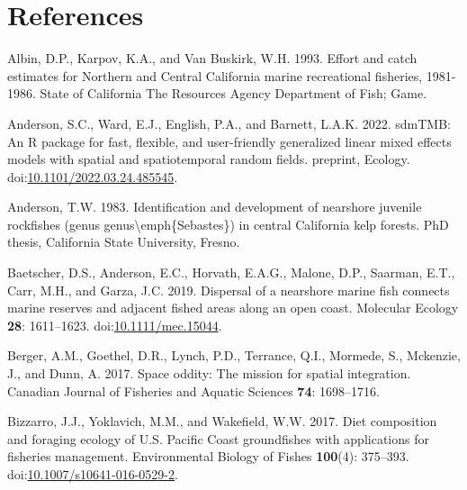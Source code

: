 \documentclass[11pt,
  english,
  letterpaper,
]{article}
\newlength{\cslhangindent}
\newenvironment{CSLReferences}[2] %
 {%
  \setlength{\parindent}{0pt}
  \ifodd #1 \everypar{\setlength{\hangindent}{\cslhangindent}}\ignorespaces\fi
  \ifnum #2 > 0
  \setlength{\parskip}{#2\baselineskip}
  \fi
 }%
 {}
\begin{document}
\hypertarget{references}{%
\section{References}\label{references}}

\hypertarget{refs}{}
\begin{CSLReferences}{1}{0}
\leavevmode{}%
Albin, D.P., Karpov, K.A., and Van Buskirk, W.H. 1993. Effort and catch estimates for {Northern} and {Central} {California} marine recreational fisheries, 1981-1986. State of California The Resources Agency Department of Fish; Game.

\leavevmode{}%
Anderson, S.C., Ward, E.J., English, P.A., and Barnett, L.A.K. 2022. {sdmTMB}: An {R} package for fast, flexible, and user-friendly generalized linear mixed effects models with spatial and spatiotemporal random fields. preprint, Ecology. doi:\href{https://doi.org/10.1101/2022.03.24.485545}{10.1101/2022.03.24.485545}.

\leavevmode{}%
Anderson, T.W. 1983. Identification and development of nearshore juvenile rockfishes (genus genus{\textbackslash{}}emph\{{Sebastes}\}) in central {California} kelp forests. PhD thesis, California State University, Fresno.

\leavevmode{}%
Baetscher, D.S., Anderson, E.C., Horvath, E.A.G., Malone, D.P., Saarman, E.T., Carr, M.H., and Garza, J.C. 2019. Dispersal of a nearshore marine fish connects marine reserves and adjacent fished areas along an open coast. Molecular Ecology \textbf{28}: 1611--1623. doi:\href{https://doi.org/10.1111/mec.15044}{10.1111/mec.15044}.

\leavevmode{}%
Berger, A.M., Goethel, D.R., Lynch, P.D., Terrance, Q.I., Mormede, S., Mckenzie, J., and Dunn, A. 2017. Space oddity: {The} mission for spatial integration. Canadian Journal of Fisheries and Aquatic Sciences \textbf{74}: 1698--1716.

\leavevmode{}%
Bizzarro, J.J., Yoklavich, M.M., and Wakefield, W.W. 2017. Diet composition and foraging ecology of {U}.{S}. {Pacific} {Coast} groundfishes with applications for fisheries management. Environmental Biology of Fishes \textbf{100}(4): 375--393. doi:\href{https://doi.org/10.1007/s10641-016-0529-2}{10.1007/s10641-016-0529-2}.


\end{CSLReferences}
\end{document}
